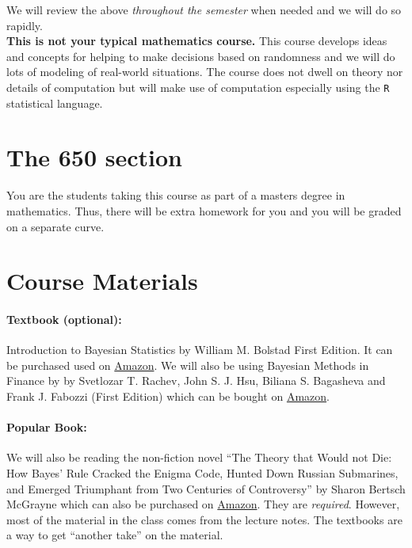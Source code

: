 \documentclass[12pt]{article}
\newcommand{\qu}[1]{``#1''}
\begin{document}
\noindent We will review the above \textit{throughout the semester} when needed and we will do so rapidly. \\

\textbf{This is not your typical mathematics course.} This course develops ideas and concepts for helping to make decisions based on randomness and we will do lots of modeling of real-world situations. The course does not dwell on theory nor details of computation but will make use of computation especially using the \texttt{R} statistical language.

\section*{The 650 section}

You are the students taking this course as part of a masters degree in mathematics. Thus, there will be extra homework for you and you will be graded on a separate curve.

\section*{Course Materials}

\paragraph{Textbook (optional):} Introduction to Bayesian Statistics by William M. Bolstad First Edition. It can be purchased used on \href{http://www.amazon.com/gp/offer-listing/0471270202/ref=sr_1_2_twi_1_har_olp?ie=UTF8&qid=1433515305&sr=8-2&keywords=introduction+to+bayesian+statistics+bolstad}{Amazon}. We will also be using Bayesian Methods in Finance by by Svetlozar T. Rachev, John S. J. Hsu, Biliana S. Bagasheva  and Frank J. Fabozzi (First Edition) which can be bought on \href{http://www.amazon.com/gp/product/0471920835/ref=ox_sc_sfl_title_1?ie=UTF8&psc=1&smid=A1Q1B6W57NND6W}{Amazon}. 

\paragraph{Popular Book:} We will also be reading the non-fiction novel \qu{The Theory that Would not Die: How Bayes' Rule Cracked the Enigma Code, Hunted Down Russian Submarines, and Emerged Triumphant from Two Centuries of Controversy} by Sharon Bertsch McGrayne which can also be purchased on \href{http://www.amazon.com/Theory-That-Would-Not-Die/dp/0300188226/ref=sr_1_1?ie=UTF8&qid=1454261896&sr=8-1&keywords=The+Theory+that+Would+not+Die}{Amazon}. They are \textit{required}. However, most of the material in the class comes from the lecture notes. The textbooks are a way to get ``another take'' on the material.
\end{document}
